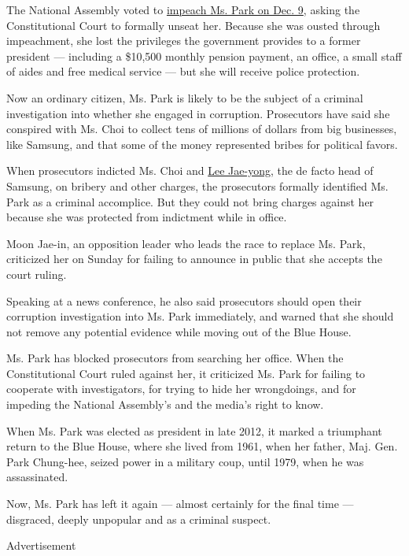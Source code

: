 The National Assembly voted to
\href{https://www.nytimes.com/2016/12/09/world/asia/south-korea-president-park-geun-hye-impeached.html}{impeach
Ms. Park on Dec. 9}, asking the Constitutional Court to formally unseat
her. Because she was ousted through impeachment, she lost the privileges
the government provides to a former president --- including a \$10,500
monthly pension payment, an office, a small staff of aides and free
medical service --- but she will receive police protection.

Now an ordinary citizen, Ms. Park is likely to be the subject of a
criminal investigation into whether she engaged in corruption.
Prosecutors have said she conspired with Ms. Choi to collect tens of
millions of dollars from big businesses, like Samsung, and that some of
the money represented bribes for political favors.

When prosecutors indicted Ms. Choi and
\href{https://www.nytimes.com/2017/02/28/world/asia/lee-jae-yong-samsung.html}{Lee
Jae-yong}, the de facto head of Samsung, on bribery and other charges,
the prosecutors formally identified Ms. Park as a criminal accomplice.
But they could not bring charges against her because she was protected
from indictment while in office.

Moon Jae-in, an opposition leader who leads the race to replace Ms.
Park, criticized her on Sunday for failing to announce in public that
she accepts the court ruling.

Speaking at a news conference, he also said prosecutors should open
their corruption investigation into Ms. Park immediately, and warned
that she should not remove any potential evidence while moving out of
the Blue House.

Ms. Park has blocked prosecutors from searching her office. When the
Constitutional Court ruled against her, it criticized Ms. Park for
failing to cooperate with investigators, for trying to hide her
wrongdoings, and for impeding the National Assembly's and the media's
right to know.

When Ms. Park was elected as president in late 2012, it marked a
triumphant return to the Blue House, where she lived from 1961, when her
father, Maj. Gen. Park Chung-hee, seized power in a military coup, until
1979, when he was assassinated.

Now, Ms. Park has left it again --- almost certainly for the final time
--- disgraced, deeply unpopular and as a criminal suspect.

Advertisement

